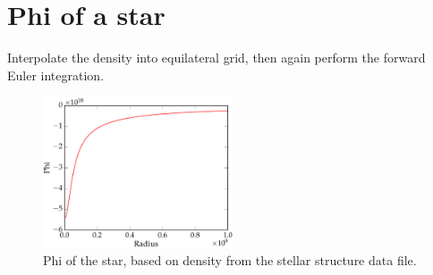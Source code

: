 \documentclass[11pt,letterpaper]{article}
\begin{document}
\newpage
\section{Phi of a star}

Interpolate the density into equilateral grid, then again perform the forward Euler integration.

\begin{figure}[h!]
	\centering
	\includegraphics[width=0.5\textwidth]{StarPhi}
	\caption{Phi of the star, based on density from the stellar structure data file.}
	\label{fig:StarPhi}
\end{figure}

	
\end{document}
